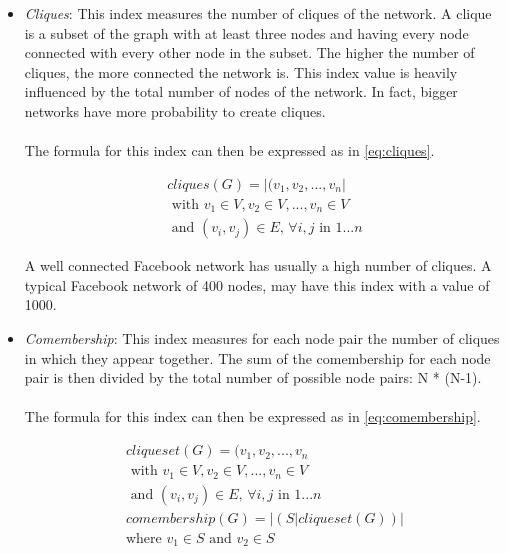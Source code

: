 \begin{itemize}
\item \emph{Cliques}: This index measures the number of cliques of the network.
A clique is a subset of the graph with at least three nodes and having every node connected with every other node in the subset.
The higher the number of cliques, the more connected the network is.
This index value is heavily inﬂuenced by the total number of nodes of the network.
In fact, bigger networks have more probability to create cliques.\\
\\
The formula for this index can then be expressed as in \ref{eq:cliques}.

\begin{equation}
\begin{split}
cliques(G) = \left | (v_{1}, v_{2}, ..., v_{n} \right | \\
\textrm{ with } v_{1} \in V, v_{2} \in V, ..., v_{n} \in V \\
\textrm{ and } (v_{i}, v_{j}) \in E \textrm{, } \forall i, j \textrm{ in } 1...n
\end{split}
\label{eq:cliques}
\end{equation}

A well connected Facebook network has usually a high number of cliques.
A typical Facebook network of 400 nodes, may have this index with a value of 1000.

\item \emph{Comembership}: This index measures for each node pair the number of cliques in which they appear together.
The sum of the comembership for each node pair is then divided by the total number of possible node pairs: N * (N-1).\\
\\
The formula for this index can then be expressed as in \ref{eq:comembership}.

\begin{equation}
\begin{split}
cliqueset(G) = (v_{1}, v_{2}, ..., v_{n} \\
\textrm{ with } v_{1} \in V, v_{2} \in V, ..., v_{n} \in V \\
\textrm{ and } (v_{i}, v_{j}) \in E \textrm{, } \forall i, j \textrm{ in } 1...n \\
comembership(G) = \left | \left ( S | cliqueset(G) \right ) \right | \\
\textrm{where } v_{1} \in S \textrm{ and } v_{2} \in S
\end{split}
\label{eq:comembership}
\end{equation}


\end{itemize}
